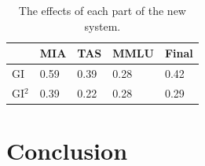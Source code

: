 \documentclass[11pt]{article}
\begin{document}
\begin{table}[h]\footnotesize
  \centering
    \begin{tabular}{l|l|l|l|l}
    \hline
        ~ & MIA & TAS & MMLU & Final \\ \hline
        GI & 0.59 & 0.39 & 0.28 & 0.42 \\ \hline
        GI$^2$ & 0.39 & 0.22 & 0.28 & 0.29 \\ \hline
    \end{tabular}
  \caption{The effects of each part of the new system.}
  \label{tab:accents}
\end{table}





\section{Conclusion} 
%





%
\end{document}

